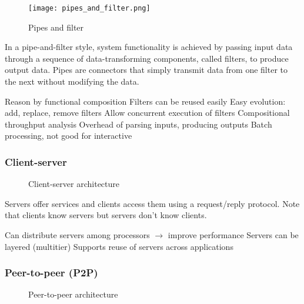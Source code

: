 \begin{figure}[!ht]
    \centering
    \texttt{[image: pipes\_and\_filter.png]}
    \caption{Pipes and filter}
\end{figure}

In a pipe-and-filter style, system functionality is achieved by passing input
data through a sequence of data-transforming components, called filters, to
produce output data. Pipes are connectors that simply transmit data from one
filter to the next without modifying the data.

\begin{itemize}
    \proitem{} Reason by functional composition
    \proitem{} Filters can be reused easily
    \proitem{} Easy evolution: add, replace, remove filters
    \proitem{} Allow concurrent execution of filters
    \proitem{} Compositional throughput analysis
    \consitem{} Overhead of parsing inputs, producing outputs
    \consitem{} Batch processing, not good for interactive
\end{itemize}

\subsubsection{Client-server}

\begin{figure}[!ht]
    \centering
    \footnotesize
    
    \caption{Client-server architecture}
\end{figure}

Servers offer services and clients access them using a request/reply protocol.
Note that clients know servers but servers don't know clients.

\begin{itemize}
    \proitem{} Can distribute servers among processors $\rightarrow$ improve
    performance
    \proitem{} Servers can be layered (multitier)
    \proitem{} Supports reuse of servers across applications
\end{itemize}

\subsubsection{Peer-to-peer (P2P)}
\begin{figure}[!ht]
    \centering
    \begin{scriptsize}
        
    \end{scriptsize}
    \caption{Peer-to-peer architecture}
\end{figure}

